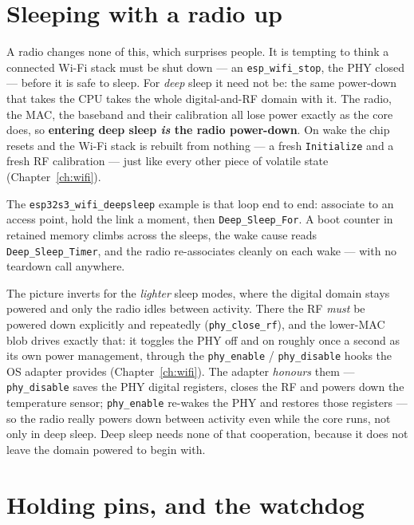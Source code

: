 \section{Sleeping with a radio up}

A radio changes none of this, which surprises people. It is tempting to think a
connected Wi-Fi stack must be shut down --- an \texttt{esp\_wifi\_stop}, the PHY
closed --- before it is safe to sleep. For \emph{deep} sleep it need not be: the same
power-down that takes the CPU takes the whole digital-and-RF domain with it. The
radio, the MAC, the baseband and their calibration all lose power exactly as the core
does, so \textbf{entering deep sleep \emph{is} the radio power-down}. On wake the chip
resets and the Wi-Fi stack is rebuilt from nothing --- a fresh \texttt{Initialize} and
a fresh RF calibration --- just like every other piece of volatile state
(Chapter~\ref{ch:wifi}).

The \texttt{esp32s3\_wifi\_deepsleep} example is that loop end to end: associate to an
access point, hold the link a moment, then \texttt{Deep\_Sleep\_For}. A boot counter in
retained memory climbs across the sleeps, the wake cause reads
\texttt{Deep\_Sleep\_Timer}, and the radio re-associates cleanly on each wake --- with
no teardown call anywhere.

The picture inverts for the \emph{lighter} sleep modes, where the digital domain stays
powered and only the radio idles between activity. There the RF \emph{must} be powered
down explicitly and repeatedly (\texttt{phy\_close\_rf}), and the lower-MAC blob drives
exactly that: it toggles the PHY off and on roughly once a second as its own power
management, through the \texttt{phy\_enable} / \texttt{phy\_disable} hooks the OS adapter
provides (Chapter~\ref{ch:wifi}). The adapter \emph{honours} them --- \texttt{phy\_disable}
saves the PHY digital registers, closes the RF and powers down the temperature sensor;
\texttt{phy\_enable} re-wakes the PHY and restores those registers --- so the radio
really powers down between activity even while the core runs, not only in deep sleep.
Deep sleep needs none of that cooperation, because it does not leave the domain powered
to begin with.

\section{Holding pins, and the watchdog}

